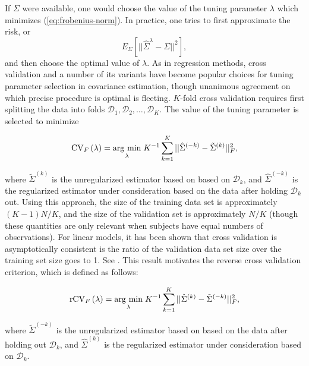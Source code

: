 If $\Sigma$ were available, one would choose the value of the tuning parameter $\lambda$ which minimizes (\ref{eq:frobenius-norm}). In practice, one tries to first approximate the risk, or 
\[
E_\Sigma\left[\vert \vert  \hat{\Sigma}^\lambda - \Sigma \vert \vert^2 \right],
\]
\noindent
and then choose the optimal value of $\lambda$.  As in regression methods, cross validation and a number of its variants have become popular choices for tuning parameter selection in covariance estimation, though unanimous agreement on which precise procedure is optimal is fleeting.  $K$-fold cross validation requires first splitting the data into folds $\mathcal{D}_1, \mathcal{D}_2, \dots, \mathcal{D}_K$. The value of the tuning parameter is selected to minimize

\begin{equation} \label{eq:K-fold-matrix--cv}
\mbox{CV}_F\left(\lambda \right) = \underset{\lambda}{\operatorname{arg}\,\operatorname{min}}\; K^{-1} \sum_{k = 1}^K  \vert \vert\hat{\Sigma}^{\left(-k\right)} - \tilde{\Sigma}^{\left(k\right)}  \vert \vert_F^2, 
\end{equation}
\noindent

where $\tilde{\Sigma}^{\left(k\right)}$ is the unregularized estimator based on based on $\mathcal{D}_k$, and $\hat{\Sigma}^{\left(-k\right)}$ is the regularized estimator under consideration based on the data after holding $\mathcal{D}_k$ out.  Using this approach, the size of the training data set is approximately $\left(K - 1 \right)N/K$, and the size of the validation set is approximately $N/K$ (though these quantities are only relevant when subjects have equal numbers of observations). For linear models, it has been shown that cross validation is asymptotically consistent is the ratio of the validation data set size over the training set size goes to 1. See \cite{shao1993linear}. This result motivates the reverse cross validation criterion, which is defined as follows:

\begin{equation} \label{eq:K-fold-matrix-reverse-cv}
\mbox{rCV}_F\left(\lambda \right) = \underset{\lambda}{\operatorname{arg}\,\operatorname{min}}\; K^{-1} \sum_{k = 1}^K  \vert \vert\hat{\Sigma}^{\left(k\right)} - \tilde{\Sigma}^{\left(-k\right)}  \vert \vert_F^2, 
\end{equation}

\noindent
where $\tilde{\Sigma}^{\left(-k\right)}$ is the unregularized estimator based on based on the data after holding out $\mathcal{D}_k$, and $\hat{\Sigma}^{\left(k\right)}$ is the regularized estimator under consideration based on $\mathcal{D}_k$. 


